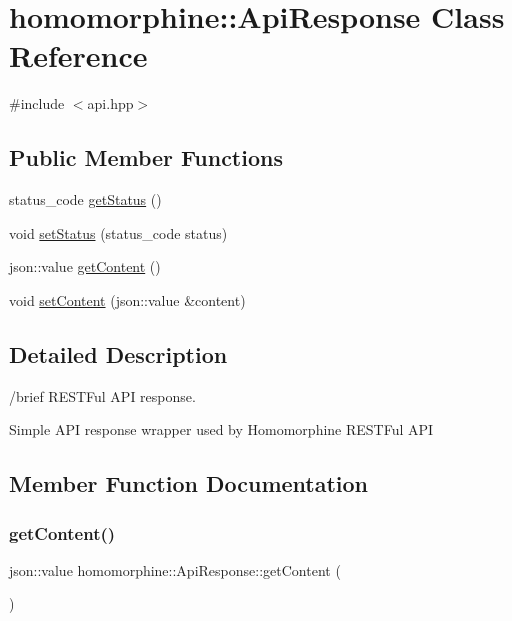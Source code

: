 \hypertarget{classhomomorphine_1_1_api_response}{}\section{homomorphine\+::Api\+Response Class Reference}
\label{classhomomorphine_1_1_api_response}


{\ttfamily \#include $<$api.\+hpp$>$}

\subsection*{Public Member Functions}
\begin{DoxyCompactItemize}
\item 
status\+\_\+code \mbox{\hyperlink{classhomomorphine_1_1_api_response_abe5d8dbece3cffee08905bb9389a8fd0}{get\+Status}} ()
\item 
void \mbox{\hyperlink{classhomomorphine_1_1_api_response_a3823ad464f6011397be80c62e391171c}{set\+Status}} (status\+\_\+code status)
\item 
json\+::value \mbox{\hyperlink{classhomomorphine_1_1_api_response_ae816a0c652d2cd47d88a67dda85024c4}{get\+Content}} ()
\item 
void \mbox{\hyperlink{classhomomorphine_1_1_api_response_aee304405cacc0b976145d2a3465ea7e5}{set\+Content}} (json\+::value \&content)
\end{DoxyCompactItemize}


\subsection{Detailed Description}
/brief R\+E\+S\+T\+Ful A\+PI response.

Simple A\+PI response wrapper used by Homomorphine R\+E\+S\+T\+Ful A\+PI 

\subsection{Member Function Documentation}
\mbox{\label{classhomomorphine_1_1_api_response_ae816a0c652d2cd47d88a67dda85024c4}} 
\subsubsection{\texorpdfstring{getContent()}{getContent()}}
{\footnotesize\ttfamily json\+::value homomorphine\+::\+Api\+Response\+::get\+Content (\begin{DoxyParamCaption}{ }\end{DoxyParamCaption})}

